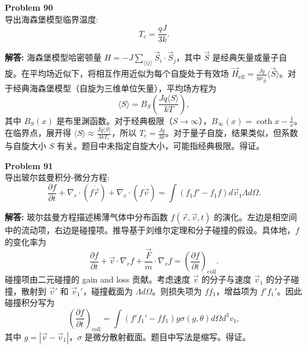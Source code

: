 \documentclass[12pt, a4paper, oneside]{ctexart}
\newenvironment{solution}{\par\noindent\textbf{解答:}\quad}{\par}
\begin{document}
\begin{mdframed}[backgroundcolor=gray!10, linewidth=0pt]
    \textbf{Problem 90} \\
    导出海森堡模型临界温度:
    \[
    T_c = \frac{q J}{3 k}.
    \]
\end{mdframed}
\begin{solution}
    海森堡模型哈密顿量 $H = -J \sum_{\langle ij \rangle} \vec{S}_i \cdot \vec{S}_j$，其中 $\vec{S}$ 是经典矢量或量子自旋。在平均场近似下，将相互作用近似为每个自旋处于有效场 $\vec{H}_{\text{eff}} = \frac{J q}{g \mu_B} \langle \vec{S} \rangle$。对于经典海森堡模型（自旋为三维单位矢量），平均场方程为
    \[
    \langle S \rangle = B_S \left( \frac{J q \langle S \rangle}{k T} \right),
    \]
    其中 $B_S(x)$ 是布里渊函数。对于经典极限（$S \to \infty$），$B_\infty(x) = \coth x - \frac{1}{x}$。在临界点，展开得 $\langle S \rangle \approx \frac{J q \langle S \rangle}{3 k T_c}$，所以 $T_c = \frac{J q}{3 k}$。对于量子自旋，结果类似，但系数与自旋大小 $S$ 有关。题目中未指定自旋大小，可能指经典极限。得证。
\end{solution}

\begin{mdframed}[backgroundcolor=gray!10, linewidth=0pt]
    \textbf{Problem 91} \\
    导出玻尔兹曼积分-微分方程:
    \[
    \frac{\partial f}{\partial t} + \nabla_r \cdot (f \dot{\vec{r}}) + \nabla_v \cdot (f \dot{\vec{v}}) = \int (f_1 f' - f_1 f) d\vec{v}_1 \Lambda d\Omega.
    \]
\end{mdframed}
\begin{solution}
    玻尔兹曼方程描述稀薄气体中分布函数 $f(\vec{r}, \vec{v}, t)$ 的演化。左边是相空间中的流动项，右边是碰撞项。推导基于刘维尔定理和分子碰撞的假设。具体地，$f$ 的变化率为
    \[
    \frac{\partial f}{\partial t} + \vec{v} \cdot \nabla_r f + \frac{\vec{F}}{m} \cdot \nabla_v f = \left( \frac{\partial f}{\partial t} \right)_{\text{coll}}.
    \]
    碰撞项由二元碰撞的 gain and loss 贡献。考虑速度 $\vec{v}$ 的分子与速度 $\vec{v}_1$ 的分子碰撞，散射到 $\vec{v}'$ 和 $\vec{v}_1'$，碰撞截面为 $\Lambda d\Omega$。则损失项为 $f f_1$，增益项为 $f' f_1'$。因此碰撞积分写为
    \[
    \left( \frac{\partial f}{\partial t} \right)_{\text{coll}} = \int (f' f_1' - f f_1) g \sigma(g, \theta) d\Omega d^3 v_1,
    \]
    其中 $g = |\vec{v} - \vec{v}_1|$，$\sigma$ 是微分散射截面。题目中写法是缩写。得证。
\end{solution}
\end{document}
